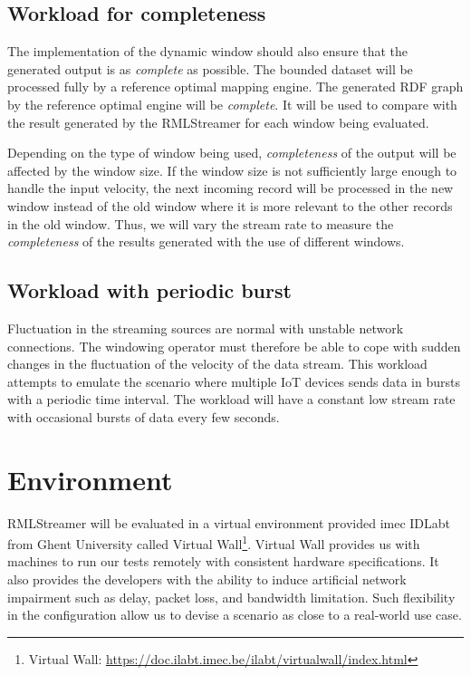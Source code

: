 \subsection{Workload for completeness}
The implementation of the dynamic window should also ensure that the generated 
output is as \emph{complete} as possible. The bounded dataset will be processed fully by 
a reference optimal mapping engine. The generated RDF graph by the reference 
optimal engine will be \emph{complete}. It will be used to compare with the result 
generated by the RMLStreamer for each window being evaluated. 

Depending on the type of window being used, \emph{completeness} of the output will be
affected by the window size. If the window size is not sufficiently large enough to handle 
the input velocity, the next incoming record will be processed in the new window instead of 
the old window where it is more relevant to the other records in the old window. Thus, 
we will vary the stream rate to measure the \emph{completeness} of the results generated 
with the use of different windows.

\subsection{Workload with periodic burst}
Fluctuation in the streaming sources are normal with unstable network connections. 
The windowing operator must therefore be able to cope with sudden changes in the 
fluctuation of the velocity of the data stream. This workload attempts to emulate 
the scenario where multiple IoT devices sends data in bursts with a periodic 
time interval. The workload will have a constant low stream rate with occasional 
bursts of data every few seconds. 


\section{Environment}

RMLStreamer will be evaluated in a virtual environment provided imec IDLabt from Ghent 
University called Virtual Wall\footnote{Virtual Wall: \href{https://doc.ilabt.imec.be/ilabt/virtualwall/index.html}{https://doc.ilabt.imec.be/ilabt/virtualwall/index.html}}.
Virtual Wall provides us with machines to run our tests remotely with consistent 
hardware specifications. It also provides the developers with the ability to induce 
artificial network impairment such as delay, packet loss, and bandwidth limitation. Such 
flexibility in the configuration allow us to devise a scenario as close to a real-world use case. 

